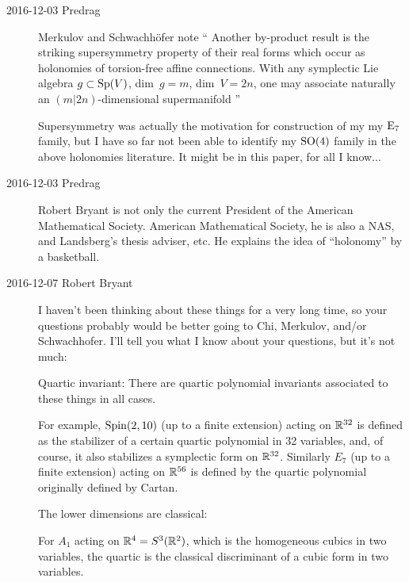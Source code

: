 \begin{description}

\item[2016-12-03 Predrag]
Merkulov and Schwachh{\"o}fer note
``
Another by-product result is  the striking supersymmetry property of their
real forms which occur as holonomies of torsion-free affine connections. With
any symplectic Lie algebra $g \subset {\rm Sp}(V)$, dim~$g = m$, dim~$V = 2n$, one
may associate naturally an $(m|2n)$-dimensional supermanifold
''

Supersymmetry was actually the motivation for construction of my my ${\rm E}_7$
family, but I have so far not been able to identify my $\textrm{SO}(4)$
family in the above holonomies literature. It might be in this
paper, for all I know...

\item[2016-12-03 Predrag]
 {Robert Bryant}
is not only the current President of the American Mathematical Society.
American Mathematical Society, he is also a NAS, and Landsberg's thesis
adviser, etc. He explains the idea of ``holonomy'' by a
{basketball}.

\item[2016-12-07 Robert Bryant]

I haven't been thinking about these things for a very long time, so your
questions probably would be better going to Chi, Merkulov, and/or
Schwachhofer.  I'll tell you what I know about your questions, but it's not
much:

Quartic invariant:
There are quartic polynomial invariants associated to these things in all cases.

        For example, ${\rm Spin}(2,10)$ (up to a finite extension) acting on $\mathbb{R}^{32}$
        is defined as the stabilizer of a certain quartic polynomial in 32
        variables, and, of course, it also stabilizes a symplectic form on
        $\mathbb{R}^{32}$.  Similarly $E_7$ (up to a finite extension) acting on $\mathbb{R}^{56}$ is
        defined by the quartic polynomial originally defined by Cartan.

        The lower dimensions are classical:

For $A_1$ acting on $\mathbb{R}^4 =
        S^3(\mathbb{R}^2)$, which is the homogeneous cubics in two variables, the
        quartic is the classical discriminant of a cubic form in two
        variables.


\end{description}
